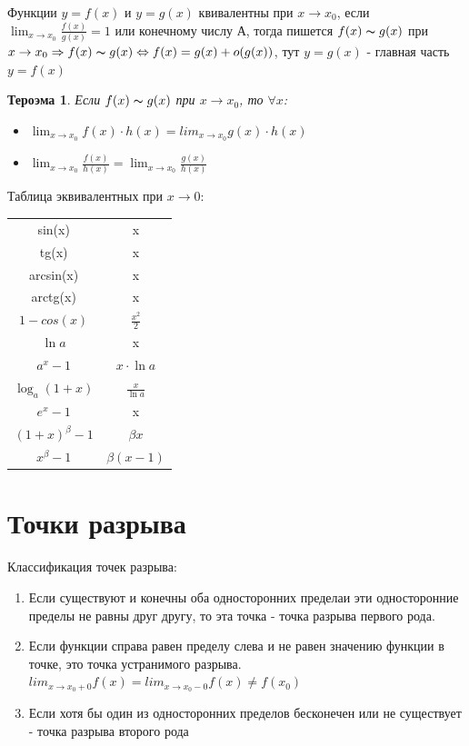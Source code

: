 \documentclass[oneside]{book}
\newtheorem{thm}{Тероэма}[chapter] %
\begin{document}
\begin{enumerate}
    Функции $y = f(x)$ и $y = g(x)$ квивалентны при $x \rightarrow x_0$, если $\lim_{x \rightarrow x_0}{\frac{f(x)}{g(x)}} = 1$ или
    конечному числу А, тогда пишется $f(x) \thicksim g(x)$ при $x \rightarrow x_0 \Rightarrow f(x) \thicksim g(x) \Leftrightarrow
    f(x) = g(x) + o(g(x))$, тут $y = g(x)$ - главная часть $y = f(x)$
    \begin{thm}
        Если $f(x) \thicksim g(x)$ при $x \rightarrow x_0$, то $\forall x$: \begin{itemize}
            \item $\lim_{x \rightarrow x_0}{f(x) \cdot h(x)} = lim_{x \rightarrow x_0}{g(x) \cdot h(x)}$
            \item $\lim_{x \rightarrow x_0}{\frac{f(x)}{h(x)}} = \lim_{x \rightarrow x_0}{\frac{g(x)}{h(x)}}$
        \end{itemize}
    \end{thm}
    Таблица эквивалентных при $x \rightarrow 0$: \\
    \begin{center}
        \begin{tabular}{c|c}
            sin(x) & x\\
            tg(x) & x\\
            arcsin(x) & x\\
            arctg(x) & x\\
            $1 - cos(x)$ & $\frac{x^2}{2}$ \\
            $\ln{a}$ & x \\
            $a^x - 1$ & $x \cdot \ln{a}$ \\
            $\log_{a}{(1+x)}$ & $\frac{x}{\ln{a}}$ \\
            $e^x - 1$ & x \\
            $(1+x)^\beta - 1$ & $\beta x$ \\
            $x^\beta - 1$ & $\beta(x-1)$
        \end{tabular}
    \end{center}


    \setcounter{chapter}{13}
    \chapter{Точки разрыва}
    
	Классификация точек разрыва:
\begin{enumerate}
    \item Если существуют и конечны оба односторонних пределаи эти односторонние пределы не равны друг другу, то эта точка - точка разрыва
          первого рода.
    \item Если функции справа равен пределу слева и не равен значению функции в точке, это точка устранимого разрыва.
          $lim_{x \rightarrow x_0+0}{f(x)} = lim_{x \rightarrow x_0-0}{f(x)} \neq f(x_0)$
    \item Если хотя бы один из односторонних пределов бесконечен или не существует - точка разрыва второго рода
\end{enumerate}


\end{enumerate}
\end{document}

